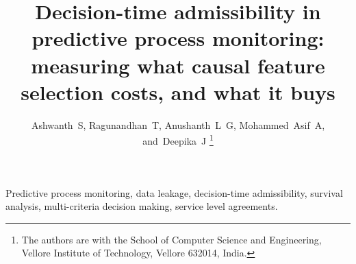 \documentclass[journal,onecolumn=false,11pt]{IEEEtran}
\begin{document}
\title{Decision-time admissibility in predictive process monitoring:
measuring what causal feature selection costs, and what it buys}

\author{Ashwanth~S,
        Ragunandhan~T,
        Anushanth~L~G,
        Mohammed~Asif~A,
        and~Deepika~J%
\thanks{The authors are with the School of Computer Science and Engineering,
Vellore Institute of Technology, Vellore 632014, India.}}

\maketitle

\begin{abstract}

\end{abstract}

\begin{IEEEkeywords}
Predictive process monitoring, data leakage, decision-time admissibility, survival analysis,
multi-criteria decision making, service level agreements.
\end{IEEEkeywords}






















\end{document}
